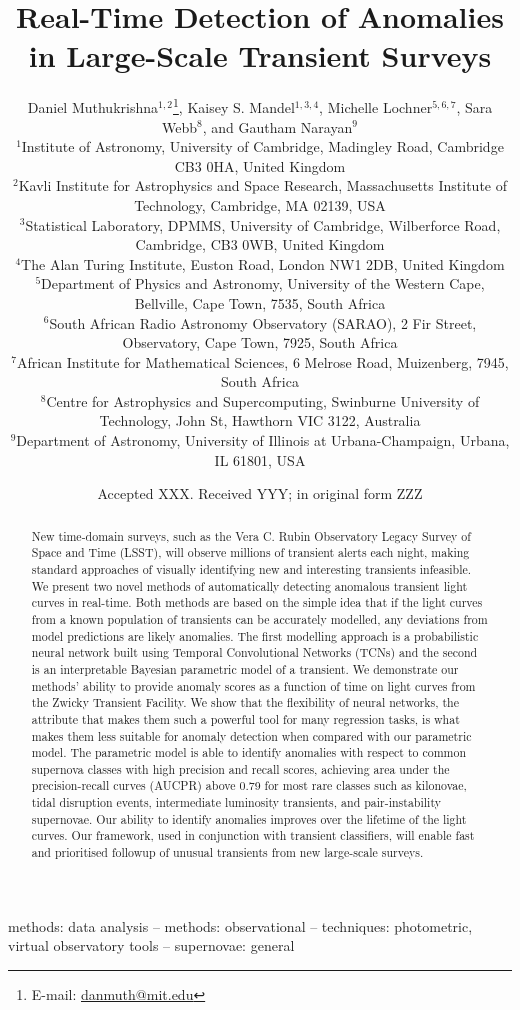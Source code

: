 \documentclass[fleqn,usenatbib]{mnras}
\title[Real-Time Anomaly Detection]{Real-Time Detection of Anomalies in Large-Scale Transient Surveys}
\author[D. Muthukrishna et al.]{
Daniel Muthukrishna$^{1,2}$\thanks{E-mail: \href{mailto:danmuth@mit.edu}{danmuth@mit.edu}},
Kaisey S. Mandel$^{1,3,4}$,
Michelle Lochner$^{5,6,7}$,
Sara Webb$^{8}$,
and Gautham Narayan$^{9}$
\\
$^{1}$Institute of Astronomy, University of Cambridge, Madingley Road, Cambridge CB3 0HA, United Kingdom\\
$^{2}$Kavli Institute for Astrophysics and Space Research, Massachusetts Institute of Technology, Cambridge, MA 02139, USA\\
$^{3}$Statistical Laboratory, DPMMS, University of Cambridge, Wilberforce Road, Cambridge, CB3 0WB, United Kingdom \\
$^{4}$The Alan Turing Institute, Euston Road, London NW1 2DB, United Kingdom\\
$^{5}$Department of Physics and Astronomy, University of the Western Cape, Bellville, Cape Town, 7535, South Africa \\
$^{6}$South African Radio Astronomy Observatory (SARAO), 2 Fir Street, Observatory, Cape Town, 7925, South Africa \\
$^{7}$African Institute for Mathematical Sciences, 6 Melrose Road, Muizenberg, 7945, South Africa \\
$^{8}$Centre for Astrophysics and Supercomputing, Swinburne University of Technology, John St, Hawthorn VIC 3122, Australia\\
$^{9}$Department of Astronomy, University of Illinois at Urbana-Champaign, Urbana, IL 61801, USA\\
}
\date{Accepted XXX. Received YYY; in original form ZZZ}
\begin{document}
\label{firstpage}
\pagerange{\pageref{firstpage}--\pageref{lastpage}}
\maketitle

\begin{abstract}
New time-domain surveys, such as the Vera C. Rubin Observatory Legacy Survey of Space and Time (LSST), will observe millions of transient alerts each night, making standard approaches of visually identifying new and interesting transients infeasible. We present two novel methods of automatically detecting anomalous transient light curves in real-time. Both methods are based on the simple idea that if the light curves from a known population of transients can be accurately modelled, any deviations from model predictions are likely anomalies. The first modelling approach is a probabilistic neural network built using Temporal Convolutional Networks (TCNs) and the second is an interpretable Bayesian parametric model of a transient. We demonstrate our methods' ability to provide anomaly scores as a function of time on light curves from the Zwicky Transient Facility. We show that the flexibility of neural networks, the attribute that makes them such a powerful tool for many regression tasks, is what makes them less suitable for anomaly detection when compared with our parametric model. The parametric model is able to identify anomalies with respect to common supernova classes with high precision and recall scores, achieving area under the precision-recall curves (AUCPR) above 0.79 for most rare classes such as kilonovae, tidal disruption events, intermediate luminosity transients, and pair-instability supernovae. Our ability to identify anomalies improves over the lifetime of the light curves. Our framework, used in conjunction with transient classifiers, will enable fast and prioritised followup of unusual transients from new large-scale surveys.  

\end{abstract}


\begin{keywords}
methods: data analysis -- methods: observational -- techniques: photometric, virtual observatory tools -- supernovae: general
\end{keywords}

\end{document}
